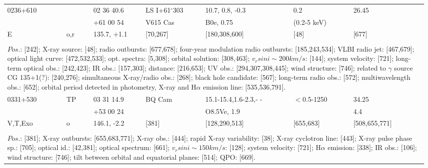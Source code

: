 \documentclass{aa}
\begin{document}
\begin{table*}[h]
\begin{tabular}{p{2.5cm}p{1cm}p{1.8cm}p{2.3cm}p{3.3cm}p{2.0cm}p{2.2cm}}
\noalign{\smallskip}
\hline
\noalign{\smallskip}
 0236+610          &          & 02 36 40.6     & LS I+61$^\circ$303    & 10.7, 0.8, -0.3           &  0.2                 &  26.45   \\
                            &           & +61 00 54      &  V615 Cas                    & B0e, 0.75                 & (0.2-5 keV)    &               \\
E                         &  o,r    & 135.7, +1.1    &     [70,267]                     &    [180,308,600]      &   [48]               & [677]   \\
\\
\multicolumn{7}{p{17.5cm}}{
$Pos$.: [242]; X-ray source: [48]; radio outbursts: [677,678]; four-year modulation radio outbursts: [185,243,534]; 
VLBI radio jet: [467,679]; optical light curve: [472,532,533]; opt. spectra: [5,308]; orbital solution: [308,463];
 $v_rsin i \sim 200 km/s$: [144]; system velocity: [721]; long-term optical obs.: [242,423]; IR obs.: [157,303]; distance: [216,653];
UV obs.: [294,307,308,445]; wind structure: [746]; related to $\gamma$ source CG 135+1(?): [240,276];
simultaneous X-ray/radio obs.: [268]; black hole candidate: [567]; long-term radio obs.: [572]; 
multiwavelength obs.: [652]; orbital period detected in photometry, X-ray and H$\alpha$ emission line: [535,536,791].}\\

\noalign{\smallskip}
\hline
\noalign{\smallskip}
 0331+530      &   TP    & 03 31 14.9    &  BQ Cam  & 15.1-15.4,1.6-2.3,- - &  $<$0.5-1250  & 34.25                 \\
                         &           & +53 00 24      &                    & O8.5Ve, 1.9               &                          & 4.4                      \\
V,T,Exo           &  o    & 146.1, -2.2       &     [381]      & [128,290,513]           &  [655,683]       & [508,655,771]   \\
\\
\multicolumn{7}{p{17.5cm}}{
$Pos$.: [381]; X-ray outbursts: [655,683,771]; X-ray obs.: [444]; rapid X-ray variability: [38]; X-ray cyclotron line:
[443]; X-ray pulse phase sp.: [705]; optical id.: [42,381]; optical spectrum: [661]; $v_rsin i \sim 150 km/s$: [128]; 
system velocity: [721]; H$\alpha$ emission: [338]; IR obs.: [106]; wind structure: [746]; tilt between orbital and 
equatorial planes: [514]; QPO: [669].}\\


\end{tabular}
\end{table*}
\end{document}
